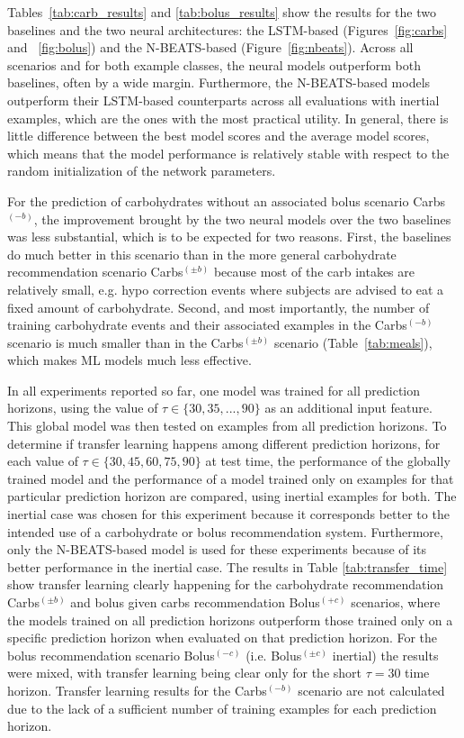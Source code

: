 Tables~\ref{tab:carb_results} and \ref{tab:bolus_results} show the results for the two baselines and the two neural architectures: the \ac{LSTM}-based (Figures~\ref{fig:carbs} and ~\ref{fig:bolus}) and the \ac{N-BEATS}-based (Figure~\ref{fig:nbeats}). Across all scenarios and for both example classes, the neural models outperform both baselines, often by a wide margin. Furthermore, the \ac{N-BEATS}-based models outperform their \ac{LSTM}-based counterparts across all evaluations with inertial examples, which are the ones with the most practical utility. In general, there is little difference between the best model scores and the average model scores, which means that the model performance is relatively stable with respect to the random initialization of the network parameters.

For the prediction of carbohydrates without an associated bolus scenario Carbs$^{(-b)}$, the improvement brought by the two neural models over the two baselines was less substantial, which is to be expected for two reasons. First, the baselines do much better in this scenario than in the more general carbohydrate recommendation scenario Carbs$^{(\pm b)}$ because most of the carb intakes are relatively small, e.g. hypo correction events where subjects are advised to eat a fixed amount of carbohydrate. Second, and most importantly, the number of training carbohydrate events and their associated examples in the Carbs$^{(-b)}$ scenario is much smaller than in the Carbs$^{(\pm b)}$ scenario (Table~\ref{tab:meals}), which makes ML models much less effective.


In all experiments reported so far, one model was trained for all prediction horizons, using the value of $\tau \in \{30, 35, ..., 90\}$ as an additional input feature. This global model was then tested on examples from all prediction horizons. To determine if transfer learning happens among different prediction horizons, for each value of $\tau \in \{30, 45, 60, 75, 90\}$ at test time, the performance of the globally trained model and the performance of a model trained only on examples for that particular prediction horizon are compared, using inertial examples for both. The inertial case was chosen for this experiment because it corresponds better to the intended use of a carbohydrate or bolus recommendation system. Furthermore, only the \ac{N-BEATS}-based model is used for these experiments because of its better performance in the inertial case. The results in Table \ref{tab:transfer_time} show transfer learning clearly happening for the carbohydrate recommendation Carbs$^{(\pm b)}$ and bolus given carbs recommendation Bolus$^{(+c)}$ scenarios, where the models trained on all prediction horizons outperform those trained only on a specific prediction horizon when evaluated on that prediction horizon. For the bolus recommendation scenario Bolus$^{(-c)}$ (i.e. Bolus$^{(\pm c)}$ inertial) the results were mixed, with transfer learning being clear only for the short $\tau = 30$ time horizon. Transfer learning results for the Carbs$^{(-b)}$ scenario are not calculated due to the lack of a sufficient number of training examples for each prediction horizon.


